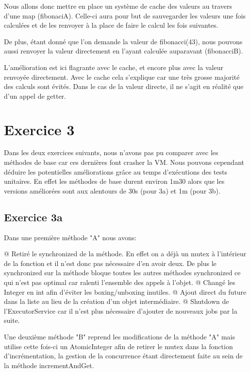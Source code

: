 \documentclass[12pt]{extreport}
\begin{document}
		Nous allons donc mettre en place un système de cache des valeurs au travers d'une map (fibonaciA).
		Celle-ci aura pour but de sauvegarder les valeurs une fois calculées et de les renvoyer à la place de faire le calcul les fois suivantes.
				
		De plus, étant donné que l'on demande la valeur de fibonacci(43), nous pouvons aussi renvoyer la valeur directement en l'ayant calculée auparavant (fibonacciB).
		
		
		
		L'amélioration est ici flagrante avec le cache, et encore plus avec la valeur renvoyée directement.
		Avec le cache cela s'explique car une très grosse majorité des calculs sont évités.
		Dans le cas de la valeur directe, il ne s'agit en réalité que d'un appel de getter.
	
	\section{Exercice 3}
		Dans les deux exercices suivants, nous n'avons pas pu comparer avec les méthodes de base car ces dernières font crasher la VM.
		Nous pouvons cependant déduire les potentielles améliorations grâce au temps d'exécutions des tests unitaires.
		En effet les méthodes de base durent environ 1m30 alors que les versions améliorées sont aux alentours de 30s (pour 3a) et 1m (pour 3b).
	
		\subsection{Exercice 3a}
			Dans une première méthode "A" nous avons:
			\begin{easylist}
				@ Retiré le synchronized de la méthode. En effet on a déjà un mutex à l'intérieur de la fonction et il n'est donc pas nécessaire d'en avoir deux. De plus le synchronized sur la méthode bloque toutes les autres méthodes synchronized ce qui n'est pas optimal car ralenti l'ensemble des appels à l'objet.
				@ Changé les Integer en int afin d'éviter les boxing/unboxing inutiles.
				@ Ajout direct du future dans la liste au lieu de la création d'un objet intermédiaire.
				@ Shutdown de l'ExecutorService car il n'est plus nécessaire d'ajouter de nouveaux jobs par la suite.
			\end{easylist}
			
			Une deuxième méthode "B" reprend les modifications de la méthode "A" mais utilise cette fois-ci un AtomicInteger afin de retirer le mutex dans la fonction d'incrémentation, la gestion de la concurrence étant directement faite au sein de la méthode incrementAndGet.
			
\end{document}
